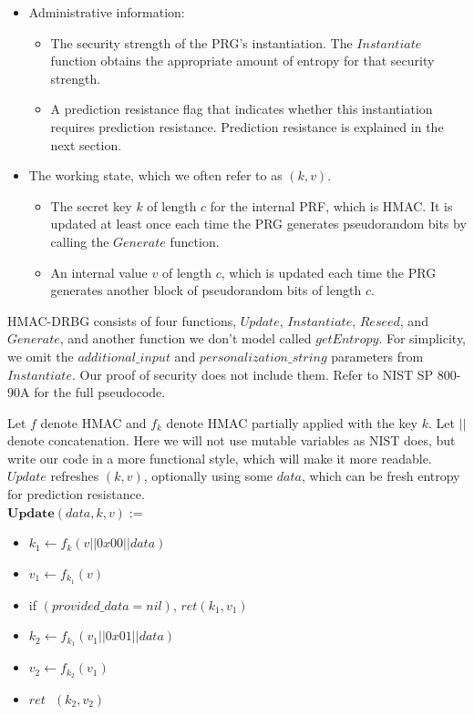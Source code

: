 \documentclass[12pt,lot, lof]{puthesis}
\newenvironment{game}
{ \begin{itemize}[noitemsep,nolistsep] 
}
{ \end{itemize}                  }
\newcommand{\s} {\textrm{ }}
\newcommand{\lar}{\leftarrow}
\begin{document}
\begin{itemize}
\item Administrative information:
  \begin{itemize}
  \item The security strength of the PRG's instantiation. The $Instantiate$ function obtains the appropriate amount of entropy for that security strength.
  \item A prediction resistance flag that indicates whether this instantiation requires prediction resistance. Prediction resistance is explained in the next section.
  \end{itemize}

  \item The working state, which we often refer to as $(k,v)$.
  \begin{itemize}
  \item The secret key $k$ of length $c$ for the internal PRF, which is HMAC. It is updated at least once each time the PRG generates pseudorandom bits by calling the $Generate$ function.
  \item An internal value $v$ of length $c$, which is updated each time the PRG generates another block of pseudorandom bits of length $c$.
  \end{itemize}

\end{itemize}

HMAC-DRBG consists of four functions, $Update$, $Instantiate$, $Reseed$, and $Generate$, and another function we don't model called $getEntropy$. For simplicity, we omit the $additional\_input$ and $personalization\_string$ parameters from $Instantiate$. Our proof of security does not include them. Refer to NIST SP 800-90A for the full pseudocode. 

Let $f$ denote HMAC and $f_k$ denote HMAC partially applied with the key $k$. Let $||$ denote concatenation. Here we will not use mutable variables as NIST does, but write our code in a more functional style, which will make it more readable.\\

$Update$ refreshes $(k, v)$, optionally using some $data$, which can be fresh entropy for prediction resistance.\\

$\textbf{Update}(data, k, v) := $
\begin{game}
\item[] $k_1 \lar f_k(v || 0x00 || data)$
\item[] $v_1 \lar f_{k_1}(v)$
\item[] if $(provided\_data = nil)$, $ret (k_1, v_1)$
\item[] $k_2 \lar f_{k_1}(v_1 || 0x01 || data)$
\item[] $v_2 \lar f_{k_2}(v_1)$
\item[] $ret \s (k_2, v_2)$\\
\end{game}
\end{document}
